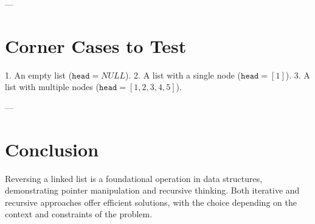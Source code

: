 ---

\section*{Corner Cases to Test}
1. An empty list (\(\texttt{head} = NULL\)).
2. A list with a single node (\(\texttt{head} = [1]\)).
3. A list with multiple nodes (\(\texttt{head} = [1, 2, 3, 4, 5]\)).

---

\section*{Conclusion}
Reversing a linked list is a foundational operation in data structures, demonstrating pointer manipulation and recursive thinking. Both iterative and recursive approaches offer efficient solutions, with the choice depending on the context and constraints of the problem.